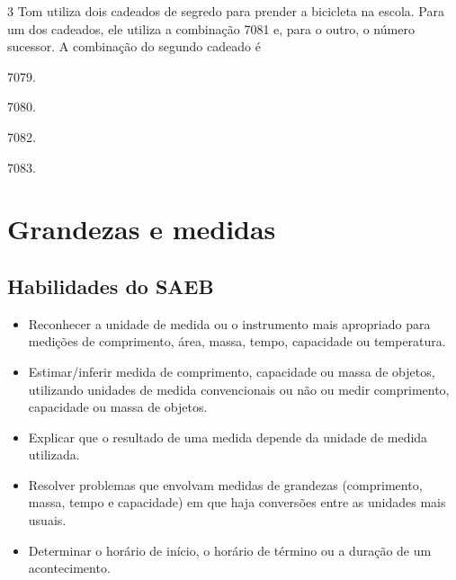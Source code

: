 \num{3} Tom utiliza dois cadeados de segredo para prender a bicicleta na escola. 
Para um dos cadeados, ele utiliza a combinação 7081 e, para o outro, o número sucessor. 
A combinação do segundo cadeado é 

\begin{escolha}
\item
  7079.
\item
  7080.
\item
  7082.
\item
  7083.
\end{escolha}

\chapter{Grandezas e medidas}

\section*{Habilidades do SAEB}

\begin{itemize}
\item Reconhecer a unidade de medida ou o instrumento mais apropriado para
medições de comprimento, área, massa, tempo, capacidade ou temperatura.

\item Estimar/inferir medida de comprimento, capacidade ou massa de objetos,
utilizando unidades de medida convencionais ou não ou medir comprimento,
capacidade ou massa de objetos.

\item Explicar que o resultado de uma medida depende da unidade de medida
utilizada.

\item Resolver problemas que envolvam medidas de grandezas (comprimento,
massa, tempo e capacidade) em que haja conversões entre as unidades mais
usuais.

\item Determinar o horário de início, o horário de término ou a duração de
um acontecimento.
\end{itemize}

